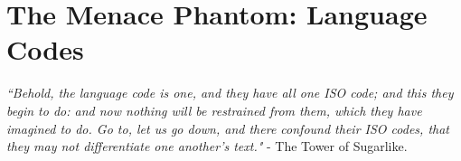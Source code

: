 \documentclass[11pt]{article}
\begin{document}
\section{The Menace Phantom: Language Codes}

\emph{``Behold, the language code is one, and they have all one ISO code; and this they begin to do: and now nothing will be restrained from them, which they have imagined to do. Go to, let us go down, and there confound their ISO codes, that they may not differentiate one another's text."} - The Tower of Sugarlike.


\
\\
\
\\

{}

\end{document}
